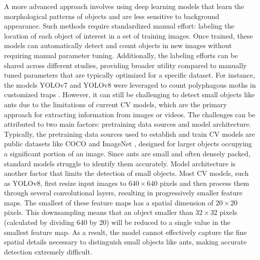 A more advanced approach involves using deep learning models that learn the morphological patterns of objects and are less sensitive to background appearance. Such methods require standardized manual effort: labeling the location of each object of interest in a set of training images. Once trained, these models can automatically detect and count objects in new images without requiring manual parameter tuning. Additionally, the labeling efforts can be shared across different studies, providing broader utility compared to manually tuned parameters that are typically optimized for a specific dataset. For instance, the models YOLOv7 \cite{wang_yolov7_2022} and YOLOv8 \cite{jocher_yolo_2023,terven_comprehensive_2023} were leveraged to count polyphagous moths in customized traps \cite{saradopoulos_image-based_2023}. However, it can still be challenging to detect small objects like ants due to the limitations of current CV models, which are the primary approach for extracting information from images or videos. The challenges can be attributed to two main factors: pretraining data sources and model architecture. Typically, the pretraining data sources used to establish and train CV models are public datasets like COCO \cite{lin_microsoft_2015} and ImageNet \cite{deng_imagenet_2009}, designed for larger objects occupying a significant portion of an image. Since ants are small and often densely packed, standard models struggle to identify them accurately. Model architecture is another factor that limits the detection of small objects. Most CV models, such as YOLOv8, first resize input images to $640 \times 640$ pixels and then process them through several convolutional layers, resulting in progressively smaller feature maps. The smallest of these feature maps has a spatial dimension of $20 \times 20$ pixels. This downsampling means that an object smaller than $32 \times 32$ pixels (calculated by dividing 640 by 20) will be reduced to a single value in the smallest feature map. As a result, the model cannot effectively capture the fine spatial details necessary to distinguish small objects like ants, making accurate detection extremely difficult.
    
